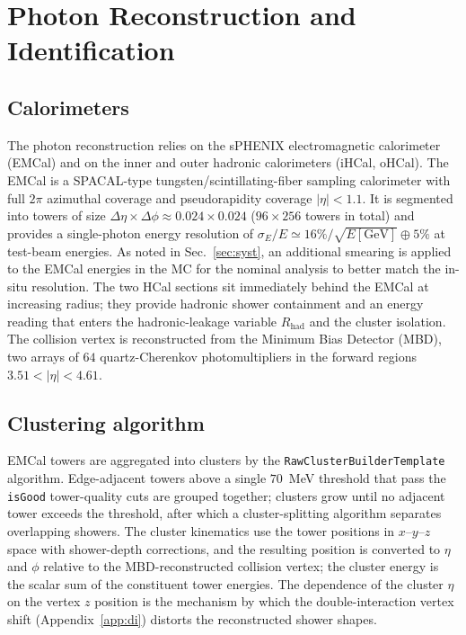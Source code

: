\documentclass[11pt]{article}
\begin{document}
\section{Photon Reconstruction and Identification}

\subsection{Calorimeters}

The photon reconstruction relies on the sPHENIX electromagnetic calorimeter
(EMCal) and on the inner and outer hadronic calorimeters (iHCal, oHCal). The
EMCal is a SPACAL-type tungsten/scintillating-fiber sampling calorimeter with full
$2\pi$ azimuthal coverage and pseudorapidity coverage $|\eta|<1.1$. It is
segmented into towers of size $\Delta\eta\times\Delta\phi\approx0.024\times0.024$
($96\times256$ towers in total) and provides a single-photon energy resolution of
$\sigma_E/E\simeq16\%/\sqrt{E[\mathrm{GeV}]}\oplus5\%$ at test-beam energies. As
noted in Sec.~\ref{sec:syst}, an additional smearing is applied to the EMCal
energies in the MC for the nominal analysis to better match the in-situ
resolution. The two HCal sections sit immediately behind the EMCal at increasing
radius; they provide hadronic shower containment and an energy reading that enters
the hadronic-leakage variable $R_{\mathrm{had}}$ and the cluster isolation. The
collision vertex is reconstructed from the Minimum Bias Detector (MBD), two arrays
of $64$ quartz-Cherenkov photomultipliers in the forward regions
$3.51 < |\eta| < 4.61$.

\subsection{Clustering algorithm}

EMCal towers are aggregated into clusters by the
\texttt{RawClusterBuilderTemplate} algorithm. Edge-adjacent towers above a single
$70$~MeV threshold that pass the \texttt{isGood} tower-quality cuts are grouped
together; clusters grow until no adjacent tower exceeds the threshold, after which
a cluster-splitting algorithm separates overlapping showers. The cluster
kinematics use the tower positions in $x$--$y$--$z$ space with shower-depth
corrections, and the resulting position is converted to $\eta$ and $\phi$ relative
to the MBD-reconstructed collision vertex; the cluster energy is the scalar sum of
the constituent tower energies. The dependence of the cluster $\eta$ on the vertex
$z$ position is the mechanism by which the double-interaction vertex shift
(Appendix~\ref{app:di}) distorts the reconstructed shower shapes.
\end{document}
